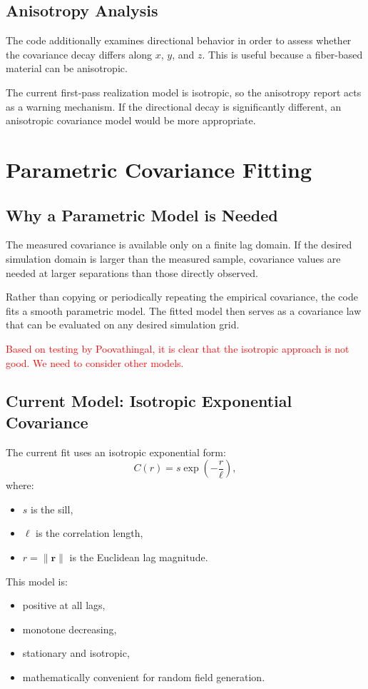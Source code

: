 \documentclass[11pt]{article}
\begin{document}
\subsection{Anisotropy Analysis}
The code additionally examines directional behavior in order to assess whether the
covariance decay differs along \(x\), \(y\), and \(z\). This is useful because a
fiber-based material can be anisotropic.

The current first-pass realization model is isotropic, so the anisotropy report
acts as a warning mechanism. If the directional decay is significantly different,
an anisotropic covariance model would be more appropriate.

\section{Parametric Covariance Fitting}
\subsection{Why a Parametric Model is Needed}
The measured covariance is available only on a finite lag domain. If the desired
simulation domain is larger than the measured sample, covariance values are
needed at larger separations than those directly observed.

Rather than copying or periodically repeating the empirical covariance, the code
fits a smooth parametric model. The fitted model then serves as a covariance law
that can be evaluated on any desired simulation grid.

\textcolor{red}{Based on testing by Poovathingal, it is clear that the isotropic approach is not good. We need to consider other models.}

\subsection{Current Model: Isotropic Exponential Covariance}
The current fit uses an isotropic exponential form:
\[
C(r) = s \exp\left(-\frac{r}{\ell}\right),
\]
where:
\begin{itemize}
\item \(s\) is the sill,
\item \(\ell\) is the correlation length,
\item \(r = \|\bm{r}\|\) is the Euclidean lag magnitude.
\end{itemize}

This model is:
\begin{itemize}
\item positive at all lags,
\item monotone decreasing,
\item stationary and isotropic,
\item mathematically convenient for random field generation.
\end{itemize}
\end{document}
